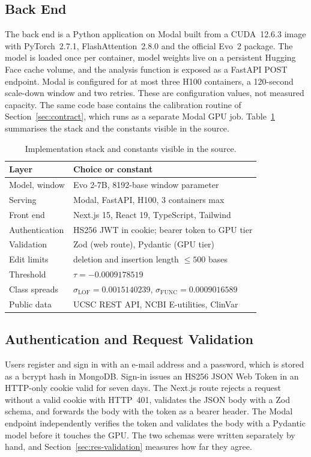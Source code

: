 \documentclass[10pt,journal,a4paper]{IEEEtran}
\begin{document}
\subsection{Back End}
The back end is a Python application on Modal built from a CUDA~12.6.3 image with PyTorch~2.7.1, FlashAttention~2.8.0 and the official Evo~2 package. The model is loaded once per container, model weights live on a persistent Hugging Face cache volume, and the analysis function is exposed as a FastAPI POST endpoint. Modal is configured for at most three H100 containers, a 120-second scale-down window and two retries. These are configuration values, not measured capacity. The same code base contains the calibration routine of Section~\ref{sec:contract}, which runs as a separate Modal GPU job. Table~\ref{tab:stack} summarises the stack and the constants visible in the source.

\begin{table}[!t]
\caption{Implementation stack and constants visible in the source.}
\label{tab:stack}
\centering
\footnotesize
\begin{tabular}{@{}ll@{}}
\toprule
Layer & Choice or constant \\
\midrule
Model, window & Evo 2-7B, 8192-base window parameter \\
Serving & Modal, FastAPI, H100, 3 containers max \\
Front end & Next.js 15, React 19, TypeScript, Tailwind \\
Authentication & HS256 JWT in cookie; bearer token to GPU tier \\
Validation & Zod (web route), Pydantic (GPU tier) \\
Edit limits & deletion and insertion length $\le 500$ bases \\
Threshold & $\tau=-0.0009178519$ \\
Class spreads & $\sigma_{\mathrm{LOF}}=0.0015140239$, $\sigma_{\mathrm{FUNC}}=0.0009016589$ \\
Public data & UCSC REST API, NCBI E-utilities, ClinVar \\
\bottomrule
\end{tabular}
\end{table}

\subsection{Authentication and Request Validation}
Users register and sign in with an e-mail address and a password, which is stored as a bcrypt hash in MongoDB. Sign-in issues an HS256 JSON Web Token in an HTTP-only cookie valid for seven days. The Next.js route rejects a request without a valid cookie with HTTP~401, validates the JSON body with a Zod schema, and forwards the body with the token as a bearer header. The Modal endpoint independently verifies the token and validates the body with a Pydantic model before it touches the GPU. The two schemas were written separately by hand, and Section~\ref{sec:res-validation} measures how far they agree.
\end{document}
